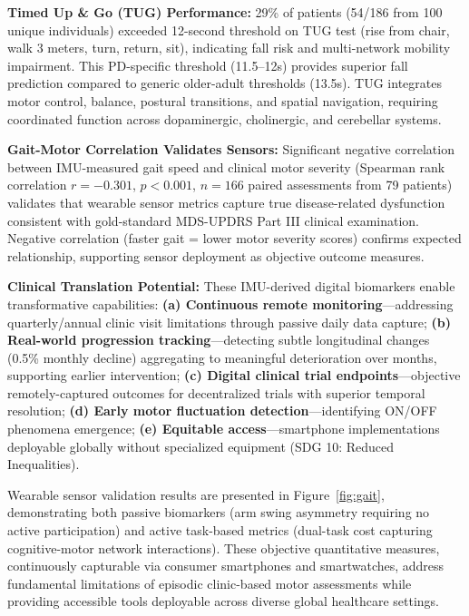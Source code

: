 \documentclass[11pt]{article}
\begin{document}
\textbf{Timed Up \& Go (TUG) Performance:} 29\% of patients (54/186 from 100 unique individuals) exceeded 12-second threshold on TUG test (rise from chair, walk 3 meters, turn, return, sit), indicating fall risk and multi-network mobility impairment\cite{nocera2013tug}. This PD-specific threshold (11.5--12s) provides superior fall prediction compared to generic older-adult thresholds (13.5s). TUG integrates motor control, balance, postural transitions, and spatial navigation, requiring coordinated function across dopaminergic, cholinergic, and cerebellar systems.

\textbf{Gait-Motor Correlation Validates Sensors:} Significant negative correlation between IMU-measured gait speed and clinical motor severity (Spearman rank correlation $r=-0.301$, $p<0.001$, $n=166$ paired assessments from 79 patients) validates that wearable sensor metrics capture true disease-related dysfunction consistent with gold-standard MDS-UPDRS Part III clinical examination\cite{goetz2008movement}. Negative correlation (faster gait = lower motor severity scores) confirms expected relationship, supporting sensor deployment as objective outcome measures.

\textbf{Clinical Translation Potential:} These IMU-derived digital biomarkers enable transformative capabilities: \textbf{(a) Continuous remote monitoring}—addressing quarterly/annual clinic visit limitations through passive daily data capture; \textbf{(b) Real-world progression tracking}—detecting subtle longitudinal changes (0.5\% monthly decline) aggregating to meaningful deterioration over months, supporting earlier intervention; \textbf{(c) Digital clinical trial endpoints}—objective remotely-captured outcomes for decentralized trials with superior temporal resolution; \textbf{(d) Early motor fluctuation detection}—identifying ON/OFF phenomena emergence; \textbf{(e) Equitable access}—smartphone implementations deployable globally without specialized equipment (SDG 10: Reduced Inequalities).

Wearable sensor validation results are presented in Figure~\ref{fig:gait}, demonstrating both passive biomarkers (arm swing asymmetry requiring no active participation) and active task-based metrics (dual-task cost capturing cognitive-motor network interactions). These objective quantitative measures, continuously capturable via consumer smartphones and smartwatches, address fundamental limitations of episodic clinic-based motor assessments while providing accessible tools deployable across diverse global healthcare settings.
\end{document}
